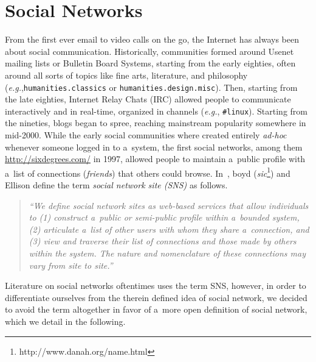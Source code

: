 \chapter{Social Networks} \label{cha:social-networks}

\ifpdf
    \graphicspath{{3_social_networks/figures/PNG/}{3_social_networks/figures/PDF/}{3_social_networks/figures/}}
\else
    \graphicspath{{3_social_networks/figures/EPS/}{3_social_networks/figures/}}
\fi

From the first ever email to video calls on the go,
the Internet has always been about social communication.
Historically, communities formed around Usenet mailing lists or Bulletin Board Systems, starting from the early eighties,
often around all sorts of topics like fine arts,
literature, and philosophy (\emph{e.g.},\texttt{humanities.classics}
or \texttt{humanities.\-design.misc}).
Then, starting from the late eighties, Internet Relay Chats (IRC)
allowed people to communicate interactively and in real-time,
organized in channels (\emph{e.g.}, \texttt{\#linux}).
Starting from the nineties, blogs began to spree,
reaching mainstream popularity somewhere in mid-2000.
While the early social communities
where created entirely \emph{ad-hoc}
whenever someone logged in to a~system,
the first social networks,
among them \url{http://sixdegrees.com/} in 1997,
allowed people to maintain a~public profile
with a~list of connections (\emph{friends})
that others could browse.
In~\cite{boyd2007socialnetworksites}, boyd
(\emph{sic}\footnote{http://www.danah.org/name.html})
and Ellison define the term
\emph{social network site (SNS)} as follows.

\begin{quotation}
  \textit{``We define social network sites as web-based services
  that allow individuals to
  (1) construct a~public or
  semi-public profile within a~bounded system,
  (2) articulate a~list of other users
  with whom they share a~connection, and
  (3) view and traverse their list of connections
  and those made by others within the system.
  The nature and nomenclature of these connections
  may vary from site to site.''}
\end{quotation}

Literature on social networks oftentimes uses the term SNS,
however, in order to differentiate ourselves
from the therein defined idea of social network,
we decided to avoid the term altogether in favor of a~more open
definition of social network,
which we detail in the following. 


